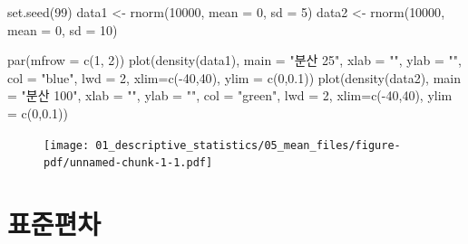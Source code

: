 \documentclass[
  letterpaper,
  DIV=11,
  numbers=noendperiod]{scrreprt}
\newenvironment{Shaded}{\begin{snugshade}}{\end{snugshade}}
\newcommand{\AttributeTok}[1]{\textcolor[rgb]{0.40,0.45,0.13}{#1}}
\newcommand{\DecValTok}[1]{\textcolor[rgb]{0.68,0.00,0.00}{#1}}
\newcommand{\FloatTok}[1]{\textcolor[rgb]{0.68,0.00,0.00}{#1}}
\newcommand{\FunctionTok}[1]{\textcolor[rgb]{0.28,0.35,0.67}{#1}}
\newcommand{\NormalTok}[1]{\textcolor[rgb]{0.00,0.23,0.31}{#1}}
\newcommand{\OtherTok}[1]{\textcolor[rgb]{0.00,0.23,0.31}{#1}}
\newcommand{\SpecialCharTok}[1]{\textcolor[rgb]{0.37,0.37,0.37}{#1}}
\newcommand{\StringTok}[1]{\textcolor[rgb]{0.13,0.47,0.30}{#1}}
\begin{document}
\begin{Shaded}
\begin{Highlighting}[]
\FunctionTok{set.seed}\NormalTok{(}\DecValTok{99}\NormalTok{)}
\NormalTok{data1 }\OtherTok{\textless{}{-}} \FunctionTok{rnorm}\NormalTok{(}\DecValTok{10000}\NormalTok{, }\AttributeTok{mean =} \DecValTok{0}\NormalTok{, }\AttributeTok{sd =} \DecValTok{5}\NormalTok{)}
\NormalTok{data2 }\OtherTok{\textless{}{-}} \FunctionTok{rnorm}\NormalTok{(}\DecValTok{10000}\NormalTok{, }\AttributeTok{mean =} \DecValTok{0}\NormalTok{, }\AttributeTok{sd =} \DecValTok{10}\NormalTok{)}

\FunctionTok{par}\NormalTok{(}\AttributeTok{mfrow =} \FunctionTok{c}\NormalTok{(}\DecValTok{1}\NormalTok{, }\DecValTok{2}\NormalTok{))}
\FunctionTok{plot}\NormalTok{(}\FunctionTok{density}\NormalTok{(data1), }\AttributeTok{main =} \StringTok{"분산 25"}\NormalTok{, }\AttributeTok{xlab =} \StringTok{""}\NormalTok{, }\AttributeTok{ylab =} \StringTok{""}\NormalTok{, }\AttributeTok{col =} \StringTok{"blue"}\NormalTok{, }\AttributeTok{lwd =} \DecValTok{2}\NormalTok{, }\AttributeTok{xlim=}\FunctionTok{c}\NormalTok{(}\SpecialCharTok{{-}}\DecValTok{40}\NormalTok{,}\DecValTok{40}\NormalTok{), }\AttributeTok{ylim =} \FunctionTok{c}\NormalTok{(}\DecValTok{0}\NormalTok{,}\FloatTok{0.1}\NormalTok{))}
\FunctionTok{plot}\NormalTok{(}\FunctionTok{density}\NormalTok{(data2), }\AttributeTok{main =} \StringTok{"분산 100"}\NormalTok{, }\AttributeTok{xlab =} \StringTok{""}\NormalTok{, }\AttributeTok{ylab =} \StringTok{""}\NormalTok{, }\AttributeTok{col =} \StringTok{"green"}\NormalTok{, }\AttributeTok{lwd =} \DecValTok{2}\NormalTok{, }\AttributeTok{xlim=}\FunctionTok{c}\NormalTok{(}\SpecialCharTok{{-}}\DecValTok{40}\NormalTok{,}\DecValTok{40}\NormalTok{), }\AttributeTok{ylim =} \FunctionTok{c}\NormalTok{(}\DecValTok{0}\NormalTok{,}\FloatTok{0.1}\NormalTok{))}
\end{Highlighting}
\end{Shaded}

\begin{figure}[H]

{\centering \texttt{[image: 01\_descriptive\_statistics/05\_mean\_files/figure-pdf/unnamed-chunk-1-1.pdf]}

}

\end{figure}

\hypertarget{uxd45cuxc900uxd3b8uxcc28}{%
\section{표준편차}\label{uxd45cuxc900uxd3b8uxcc28}}
\end{document}

